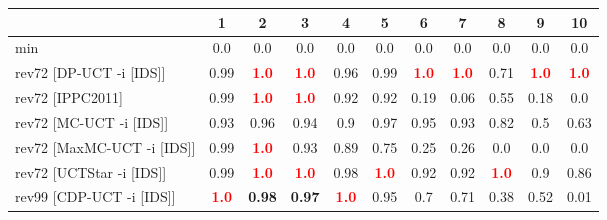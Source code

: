 \documentclass{article}
\begin{document}
\begin{tabular}{|l|r@{$\pm$}rr@{$\pm$}rr@{$\pm$}rr@{$\pm$}rr@{$\pm$}rr@{$\pm$}rr@{$\pm$}rr@{$\pm$}rr@{$\pm$}rr@{$\pm$}r|}
\hline

& \multicolumn{2}{c}{1}
& \multicolumn{2}{c}{2}
& \multicolumn{2}{c}{3}
& \multicolumn{2}{c}{4}
& \multicolumn{2}{c}{5}
& \multicolumn{2}{c}{6}
& \multicolumn{2}{c}{7}
& \multicolumn{2}{c}{8}
& \multicolumn{2}{c}{9}
& \multicolumn{2}{c|}{10}
\\
\hline
\hline
min
& \multicolumn{2}{c}{0.0}
& \multicolumn{2}{c}{0.0}
& \multicolumn{2}{c}{0.0}
& \multicolumn{2}{c}{0.0}
& \multicolumn{2}{c}{0.0}
& \multicolumn{2}{c}{0.0}
& \multicolumn{2}{c}{0.0}
& \multicolumn{2}{c}{0.0}
& \multicolumn{2}{c}{0.0}
& \multicolumn{2}{c|}{0.0}
\\
rev72 [DP-UCT -i [IDS]]
& \multicolumn{2}{c}{0.99}
& \multicolumn{2}{c}{\textbf{\textcolor{red}{1.0}}}
& \multicolumn{2}{c}{\textbf{\textcolor{red}{1.0}}}
& \multicolumn{2}{c}{0.96}
& \multicolumn{2}{c}{0.99}
& \multicolumn{2}{c}{\textbf{\textcolor{red}{1.0}}}
& \multicolumn{2}{c}{\textbf{\textcolor{red}{1.0}}}
& \multicolumn{2}{c}{0.71}
& \multicolumn{2}{c}{\textbf{\textcolor{red}{1.0}}}
& \multicolumn{2}{c|}{\textbf{\textcolor{red}{1.0}}}
\\
rev72 [IPPC2011]
& \multicolumn{2}{c}{0.99}
& \multicolumn{2}{c}{\textbf{\textcolor{red}{1.0}}}
& \multicolumn{2}{c}{\textbf{\textcolor{red}{1.0}}}
& \multicolumn{2}{c}{0.92}
& \multicolumn{2}{c}{0.92}
& \multicolumn{2}{c}{0.19}
& \multicolumn{2}{c}{0.06}
& \multicolumn{2}{c}{0.55}
& \multicolumn{2}{c}{0.18}
& \multicolumn{2}{c|}{0.0}
\\
rev72 [MC-UCT -i [IDS]]
& \multicolumn{2}{c}{0.93}
& \multicolumn{2}{c}{0.96}
& \multicolumn{2}{c}{0.94}
& \multicolumn{2}{c}{0.9}
& \multicolumn{2}{c}{0.97}
& \multicolumn{2}{c}{0.95}
& \multicolumn{2}{c}{0.93}
& \multicolumn{2}{c}{0.82}
& \multicolumn{2}{c}{0.5}
& \multicolumn{2}{c|}{0.63}
\\
rev72 [MaxMC-UCT -i [IDS]]
& \multicolumn{2}{c}{0.99}
& \multicolumn{2}{c}{\textbf{\textcolor{red}{1.0}}}
& \multicolumn{2}{c}{0.93}
& \multicolumn{2}{c}{0.89}
& \multicolumn{2}{c}{0.75}
& \multicolumn{2}{c}{0.25}
& \multicolumn{2}{c}{0.26}
& \multicolumn{2}{c}{0.0}
& \multicolumn{2}{c}{0.0}
& \multicolumn{2}{c|}{0.0}
\\
rev72 [UCTStar -i [IDS]]
& \multicolumn{2}{c}{0.99}
& \multicolumn{2}{c}{\textbf{\textcolor{red}{1.0}}}
& \multicolumn{2}{c}{\textbf{\textcolor{red}{1.0}}}
& \multicolumn{2}{c}{0.98}
& \multicolumn{2}{c}{\textbf{\textcolor{red}{1.0}}}
& \multicolumn{2}{c}{0.92}
& \multicolumn{2}{c}{0.92}
& \multicolumn{2}{c}{\textbf{\textcolor{red}{1.0}}}
& \multicolumn{2}{c}{0.9}
& \multicolumn{2}{c|}{0.86}
\\
\hline
rev99 [CDP-UCT -i [IDS]]
& \multicolumn{2}{c}{\textbf{\textcolor{red}{1.0}}}
& \multicolumn{2}{c}{\textbf{0.98}}
& \multicolumn{2}{c}{\textbf{0.97}}
& \multicolumn{2}{c}{\textbf{\textcolor{red}{1.0}}}
& \multicolumn{2}{c}{0.95}
& \multicolumn{2}{c}{0.7}
& \multicolumn{2}{c}{0.71}
& \multicolumn{2}{c}{0.38}
& \multicolumn{2}{c}{0.52}
& \multicolumn{2}{c|}{0.01}
\\
\hline
\end{tabular}%
\end{document}
